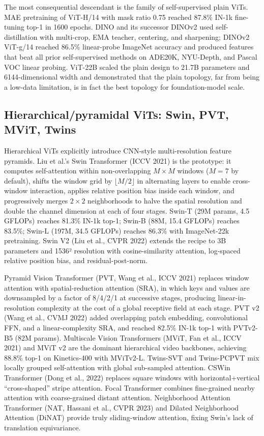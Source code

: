 The most consequential descendant is the family of self-supervised plain ViTs. MAE pretraining of ViT-H/14 with mask ratio 0.75 reached 87.8\% IN-1k fine-tuning top-1 in 1600 epochs. DINO and its successor DINOv2 used self-distillation with multi-crop, EMA teacher, centering, and sharpening; DINOv2 ViT-g/14 reached 86.5\% linear-probe ImageNet accuracy and produced features that beat all prior self-supervised methods on ADE20K, NYU-Depth, and Pascal VOC linear probing. ViT-22B scaled the plain design to 21.7B parameters and 6144-dimensional width and demonstrated that the plain topology, far from being a low-data limitation, is in fact the best topology for foundation-model scale.

\subsection{Hierarchical/pyramidal ViTs: Swin, PVT, MViT, Twins}\label{hierarchicalpyramidal-vits-swin-pvt-mvit-twins}

Hierarchical ViTs explicitly introduce CNN-style multi-resolution feature pyramids. Liu et al.'s Swin Transformer (ICCV 2021) is the prototype: it computes self-attention within non-overlapping \(M \times M\) windows (\(M=7\) by default), shifts the window grid by \(\lfloor M/2 \rfloor\) in alternating layers to enable cross-window interaction, applies relative position bias inside each window, and progressively merges \(2 \times 2\) neighborhoods to halve the spatial resolution and double the channel dimension at each of four stages. Swin-T (29M params, 4.5 GFLOPs) reaches 81.3\% IN-1k top-1; Swin-B (88M, 15.4 GFLOPs) reaches 83.5\%; Swin-L (197M, 34.5 GFLOPs) reaches 86.3\% with ImageNet-22k pretraining. Swin V2 (Liu et al., CVPR 2022) extends the recipe to 3B parameters and 1536² resolution with cosine-similarity attention, log-spaced relative position bias, and residual-post-norm.

Pyramid Vision Transformer (PVT, Wang et al., ICCV 2021) replaces window attention with spatial-reduction attention (SRA), in which keys and values are downsampled by a factor of 8/4/2/1 at successive stages, producing linear-in-resolution complexity at the cost of a global receptive field at each stage. PVT v2 (Wang et al., CVMJ 2022) added overlapping patch embedding, convolutional FFN, and a linear-complexity SRA, and reached 82.5\% IN-1k top-1 with PVTv2-B5 (82M params). Multiscale Vision Transformers (MViT, Fan et al., ICCV 2021) and MViT v2 are the dominant hierarchical video backbones, achieving 88.8\% top-1 on Kinetics-400 with MViTv2-L. Twins-SVT and Twins-PCPVT mix locally grouped self-attention with global sub-sampled attention. CSWin Transformer (Dong et al., 2022) replaces square windows with horizontal+vertical ``cross-shaped'' stripe attention. Focal Transformer combines fine-grained nearby attention with coarse-grained distant attention. Neighborhood Attention Transformer (NAT, Hassani et al., CVPR 2023) and Dilated Neighborhood Attention (DiNAT) provide truly sliding-window attention, fixing Swin's lack of translation equivariance.

